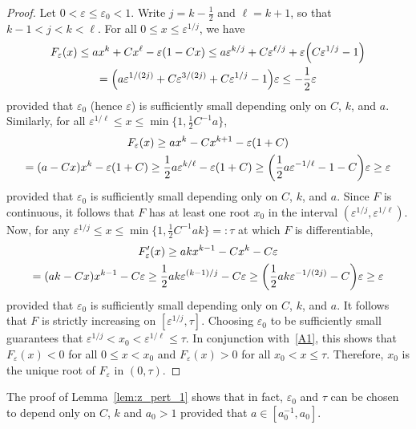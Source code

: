 \documentclass[AHL,Unicode,longabstracts,published]{cedram}
\renewcommand{\epsilon}{\varepsilon}
\let\originalleft\left
\let\originalright\right
\renewcommand{\left}{\mathopen{}\mathclose\bgroup\originalleft}
\renewcommand{\right}{\aftergroup\egroup\originalright}
\begin{document}
\begin{proof}
Let $0<\epsilon\leq \epsilon_0<1$. Write $j=k-\frac{1}{2}$ and $\ell=k+1$, so that $k-1<j<k<\ell$. For all $0\leq x\leq \epsilon^{1/j}$, we have
\begin{multline}\label{A1}
F_\epsilon(x) \leq ax^{k}+Cx^{\ell}-\epsilon(1-Cx)\leq a\epsilon^{k/j}+C\epsilon^{\ell/j}+\epsilon \left(C\epsilon^{1/j}-1\right)\\
=\left(a\epsilon^{1/(2j)}+C\epsilon^{3/(2j)} +C\epsilon^{1/j}-1\right)\epsilon\leq -\frac{1}{2}\epsilon
\end{multline}
provided that $\epsilon_0$ (hence $\epsilon$) is sufficiently small depending only on $C$, $k$, and $a$. Similarly, for all $\epsilon^{1/\ell}\leq x \leq \min\{1,\frac{1}{2}C^{-1}a\}$,
\begin{multline}
F_\epsilon(x) \geq ax^{k}-Cx^{k+1}-\epsilon(1+C)\\
= (a-Cx)x^k-\epsilon(1+C)
\geq \frac{1}{2}a \epsilon^{k/\ell}-\epsilon(1+C)\geq \left(\frac12a \epsilon^{-1/\ell}-1-C\right)\epsilon\geq \epsilon
\end{multline}
provided that $\epsilon_0$ is sufficiently small depending only on $C$, $k$, and $a$. Since $F$ is continuous, it follows that $F$ has at least one root $x_0$ in the interval $(\epsilon^{1/j},\epsilon^{1/\ell})$. Now, for any $\epsilon^{1/j}\leq x\leq \min\{1,\frac{1}{2}C^{-1}ak\}=:\tau$ at which $F$ is differentiable,
\begin{multline}
F_\epsilon'(x) \geq ak x^{k-1}-Cx^k-C\epsilon\\
=(ak-Cx)x^{k-1}-C\epsilon
\geq \frac{1}{2}ak \epsilon^{(k-1)/j}-C\epsilon\geq \left(\frac{1}{2}ak\epsilon^{-1/(2j)}-C\right)
\epsilon\geq\epsilon
\end{multline}
provided that $\epsilon_0$ is sufficiently small depending only on $C$, $k$, and $a$. It follows that $F$ is strictly increasing on $[\epsilon^{1/j},\tau]$. Choosing $\epsilon_0$ to be sufficiently small guarantees that $\epsilon^{1/j}<x_0<\epsilon^{1/\ell}\leq \tau$. In conjunction with~\eqref{A1}, this shows that $F_\epsilon(x)<0$ for all $0\leq x<x_0$ and $F_\epsilon(x)>0$ for all $x_0<x\leq \tau$. Therefore, $x_0$ is the unique root of $F_\epsilon$ in $(0,\tau)$.
\end{proof}

\begin{rema}\label{rmk:zero}
The proof of Lemma~\ref{lem:z_pert_1} shows that in fact, $\epsilon_0$ and $\tau$ can be chosen to depend only on $C$, $k$ and $a_0 >1$ provided that $a \in [a_0^{-1}, a_0]$.
\end{rema}
\end{document}

